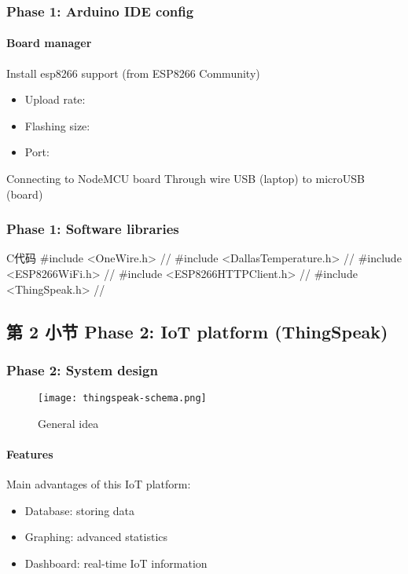 \documentclass[
    aspectratio=169,                   %
]{beamer}
\begin{document}
    \begin{frame}
        \frametitle{Phase 1: Arduino IDE config}
        
        \paragraph{Board manager} Install \alert{esp8266} support (from ESP8266 Community)

        \begin{itemize}
            \item \alert{Upload rate}: 
            \item \alert{Flashing size}: 
            \item \alert{Port}: 
        \end{itemize}

        \begin{block}{Connecting to NodeMCU board}
            Through wire USB (laptop) to microUSB (board)
        \end{block}
    \end{frame}

    \begin{frame}[fragile]          %
        \frametitle{Phase 1: Software libraries}
        \begin{codeblock}[language=c]{C代码}
#include <OneWire.h> //
#include <DallasTemperature.h> //
#include <ESP8266WiFi.h> //
#include <ESP8266HTTPClient.h> //
#include <ThingSpeak.h> //
        \end{codeblock}
    \end{frame}

\subsection{第 2 小节 Phase 2: IoT platform (ThingSpeak)}

    \begin{frame}
        \frametitle{Phase 2: System design}
        
        \begin{figure}
            \centering
            \begin{stampbox}
                \texttt{[image: thingspeak-schema.png]}
            \end{stampbox}
            \caption{General idea}
        \end{figure}

        \paragraph{Features} Main advantages of this IoT platform:

        \begin{itemize}
            \item \alert{Database}: storing data
            \item \alert{Graphing}: advanced statistics
            \item \alert{Dashboard}: real-time IoT information
        \end{itemize}
    \end{frame}
\end{document}
